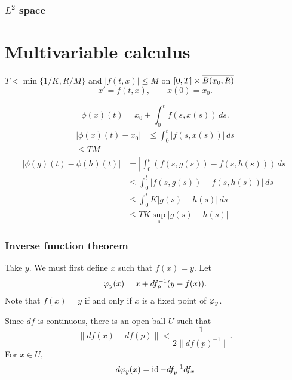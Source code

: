 \documentclass{../crs}
\begin{document}
\subsection{$L^2$ space}








\chapter{Multivariable calculus}
$T<\min\{1/K,R/M\}$ and $|f(t,x)|\le M$ on $[0,T]\times\overline{B(x_0,R)}$
\[x'=f(t,x),\qquad x(0)=x_0.\]

\[\phi(x)(t)=x_0+\int_0^tf(s,x(s))\,ds.\]
\begin{align*}
|\phi(x)(t)-x_0|&\le\int_0^t|f(s,x(s))|\,ds\\
\le TM
\end{align*}
\begin{align*}
|\phi(g)(t)-\phi(h)(t)|&=|\int_0^t(f(s,g(s))-f(s,h(s)))\,ds|\\
&\le\int_0^t|f(s,g(s))-f(s,h(s))|\,ds\\
&\le\int_0^tK|g(s)-h(s)|\,ds\\
&\le TK\sup_s|g(s)-h(s)|
\end{align*}

\subsection{Inverse function theorem}

\begin{pf}[1]
Take $y$.
We must first define $x$ such that $f(x)=y$.
Let
\[\varphi_y(x)=x+df_p^{-1}(y-f(x)).\]
Note that $f(x)=y$ if and only if $x$ is a fixed point of $\varphi_y$.

Since $df$ is continuous, there is an open ball $U$ such that
\[\|df(x)-df(p)\|<\frac1{2\|df(p)^{-1}\|}.\]
For $x\in U$,
\[d\varphi_y(x)=\operatorname{id}-df_p^{-1}df_x\]
\end{pf}
\end{document}
